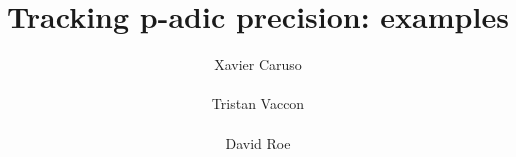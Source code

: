 \documentclass{sig-alternate}
\begin{document}
\newtheorem{theo}{Theorem}[section]
\newtheorem{lem}[theo]{Lemma}
\newtheorem{prop}[theo]{Proposition}
\newtheorem{cor}[theo]{Corollary}
\newtheorem{quest}[theo]{Question}
\newtheorem{rem}[theo]{Remark}
\newtheorem{ex}[theo]{Example}
\newtheorem{deftn}[theo]{Definition}
\newtheorem{rmk}[theo]{Remark}

\newcommand{\N}{\mathbb N}
\newcommand{\Z}{\mathbb Z}
\newcommand{\Zp}{\Z_p}
\newcommand{\Q}{\mathbb Q}
\newcommand{\Qp}{\Q_p}
\newcommand{\Fp}{\mathbb{F}_p}
\newcommand{\R}{\mathbb R}
\renewcommand{\O}{\mathcal O}
\newcommand{\OK}{\mathcal{O}_K}
\newcommand{\XX}{\mathbf X}
\newcommand{\trans}{{}^{\text t}}
\newcommand{\T}{\mathcal{T}}

\renewcommand{\prec}{\text{\rm prec}}

\newcommand{\id}{\textrm{id}}
\newcommand{\Epi}{\textrm{Epi}}

\newcommand{\lb}{\ensuremath{\llbracket}}
\newcommand{\rb}{\ensuremath{\rrbracket}}
\newcommand{\lp}{(\!(}
\newcommand{\rp}{)\!)}
\newcommand{\col}{\: : \:}

\def\todo#1{\ \!\!{\color{red} #1}}
\def\todofor#1#2{\ \!\!{\color{purple} {\bf #1}: #2}}

\def\binom#1#2{\Big(\begin{array}{cc} #1 \\ #2 \end{array}\Big)}

\title{Tracking p-adic precision: examples}

\author{
\alignauthor Xavier Caruso\\
  \\
\alignauthor Tristan Vaccon\\
  \\
\alignauthor David Roe \\
  \\
}

\maketitle

\begin{abstract}
\end{abstract}
\end{document}
